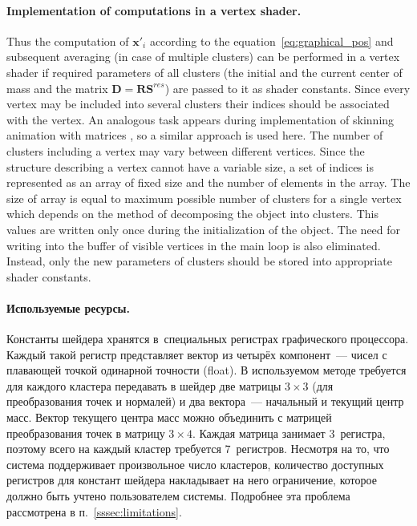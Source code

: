 \documentclass[a4paper, 12pt, titlepage]{extarticle}
\newcommand{\vect}[1]{\mathbf{#1}} %
\newcommand{\matx}[1]{\mathbf{#1}} %
\begin{document}
        \paragraph{Implementation of computations in a vertex shader.}
        Thus the computation of $\vect{x}'_i$ according to the equation~\eqref{eq:graphical_pos} and
        subsequent averaging (in case of multiple clusters) can be performed in a vertex shader if
        required parameters of all clusters (the initial and the current center of mass and the
        matrix $\matx D = \matx{R} \matx{S}^{res}$) are passed to it as shader constants. Since
        every vertex may be included into several clusters their indices should be associated with
        the vertex. An analogous task appears during implementation of skinning animation with matrices
        \cite{gpu-gems-skinning}, so a similar approach is used here. The number of clusters including
        a vertex may vary between different vertices. Since the structure describing a vertex cannot
        have a variable size, a set of indices is represented as an array of fixed size and the
        number of elements in the array. The size of array is equal to maximum possible number of
        clusters for a single vertex which depends on the method of decomposing the object into
        clusters. This values are written only once during the initialization of the object. The
        need for writing into the buffer of visible vertices in the main loop is also eliminated.
        Instead, only the new parameters of clusters should be stored into appropriate shader constants.

\begin{original}
        \paragraph{Используемые ресурсы.}
        Константы шейдера хранятся в~специальных регистрах графического процессора. Каждый такой регистр
        представляет вектор из четырёх компонент~--- чисел с плавающей точкой одинарной точности
        (float). В используемом методе требуется для каждого
        кластера передавать в шейдер две матрицы $3 \times 3$ (для преобразования точек и нормалей) и два
        вектора~--- начальный и текущий центр масс. Вектор текущего центра масс можно объединить с
        матрицей преобразования точек в матрицу $3 \times 4$. Каждая матрица занимает 3~регистра,
        поэтому всего на каждый кластер требуется 7~регистров. Несмотря на то, что система
        поддерживает произвольное число кластеров, количество доступных регистров для констант
        шейдера накладывает на него ограничение, которое должно быть учтено пользователем системы.
        Подробнее эта проблема рассмотрена в п.~\ref{sssec:limitations}.
\end{original}
\end{document}
